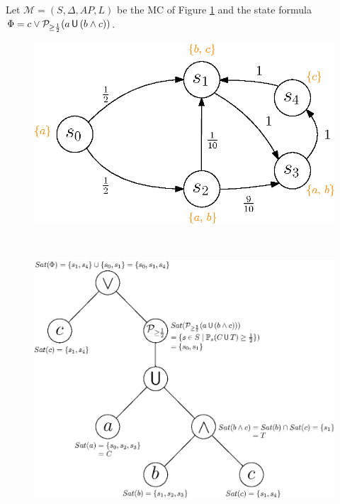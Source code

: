 \begin{example} \label{exCUT}
  Let $\mathcal{M}=(S, \Delta, AP, L)$ be the MC of Figure \ref{CUTexample2} and the state formula $\Phi = c \vee \mathcal{P}_{\geq \frac{1}{2}}(a \,\text{\sffamily U}\, (b \wedge c))$.
  \begin{figure}[h!]
  \begin{minipage}{0.4\linewidth}
    \centering
    \includegraphics[width=\linewidth]{resources/CUTexample2}
    \captionsetup{justification=centering}
    \label{CUTexample2}
  \end{minipage}
    $ \quad $
  \begin{minipage}{0.6\linewidth}
    \centering
    \includegraphics[width=\linewidth]{resources/parse-tree}

\end{minipage}
\end{figure}
\end{example}
